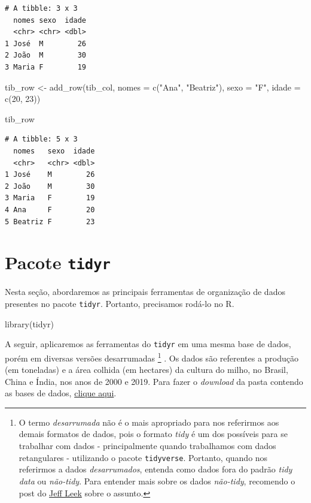 \documentclass[
  brazilian,
]{book}
\newenvironment{Shaded}{\begin{snugshade}}{\end{snugshade}}
\newcommand{\AttributeTok}[1]{\textcolor[rgb]{0.77,0.63,0.00}{#1}}
\newcommand{\DecValTok}[1]{\textcolor[rgb]{0.00,0.00,0.81}{#1}}
\newcommand{\FunctionTok}[1]{\textcolor[rgb]{0.00,0.00,0.00}{#1}}
\newcommand{\NormalTok}[1]{#1}
\newcommand{\OtherTok}[1]{\textcolor[rgb]{0.56,0.35,0.01}{#1}}
\newcommand{\StringTok}[1]{\textcolor[rgb]{0.31,0.60,0.02}{#1}}
\begin{document}
\begin{verbatim}
# A tibble: 3 x 3
  nomes sexo  idade
  <chr> <chr> <dbl>
1 José  M        26
2 João  M        30
3 Maria F        19
\end{verbatim}

\begin{Shaded}
\begin{Highlighting}[]
\NormalTok{tib\_row }\OtherTok{\textless{}{-}} \FunctionTok{add\_row}\NormalTok{(tib\_col,}
                   \AttributeTok{nomes =} \FunctionTok{c}\NormalTok{(}\StringTok{"Ana"}\NormalTok{, }\StringTok{"Beatriz"}\NormalTok{),}
                   \AttributeTok{sexo =} \StringTok{"F"}\NormalTok{,}
                   \AttributeTok{idade =} \FunctionTok{c}\NormalTok{(}\DecValTok{20}\NormalTok{, }\DecValTok{23}\NormalTok{))}

\NormalTok{tib\_row}
\end{Highlighting}
\end{Shaded}

\begin{verbatim}
# A tibble: 5 x 3
  nomes   sexo  idade
  <chr>   <chr> <dbl>
1 José    M        26
2 João    M        30
3 Maria   F        19
4 Ana     F        20
5 Beatriz F        23
\end{verbatim}

\hypertarget{pacote-tidyr}{%
\section{\texorpdfstring{Pacote \texttt{tidyr}}{Pacote tidyr}}\label{pacote-tidyr}}

Nesta seção, abordaremos as principais ferramentas de organização de dados presentes no pacote \texttt{tidyr}. Portanto, precisamos rodá-lo no R.

\begin{Shaded}
\begin{Highlighting}[]
\FunctionTok{library}\NormalTok{(tidyr)}
\end{Highlighting}
\end{Shaded}

A seguir, aplicaremos as ferramentas do \texttt{tidyr} em uma mesma base de dados, porém em diversas versões desarrumadas \footnote{O termo \emph{desarrumada} não é o mais apropriado para nos referirmos aos demais formatos de dados, pois o formato \emph{tidy} é um dos possíveis para se trabalhar com dados - principalmente quando trabalhamos com dados retangulares - utilizando o pacote \texttt{tidyverse}. Portanto, quando nos referirmos a dados \emph{desarrumados}, entenda como dados fora do padrão \emph{tidy data} ou \emph{não-tidy}. Para entender mais sobre os dados \emph{não-tidy}, recomendo o post do \href{https://simplystatistics.org/posts/2016-02-17-non-tidy-data/}{Jeff Leek} sobre o assunto.} . Os dados são referentes a produção (em toneladas) e a área colhida (em hectares) da cultura do milho, no Brasil, China e Índia, nos anos de 2000 e 2019. Para fazer o \emph{download} da pasta contendo as bases de dados, \href{https://github.com/gustavojy/ApostilaCD-R/blob/main/dados_zip/dados_tidy.zip}{clique aqui}.
\end{document}
